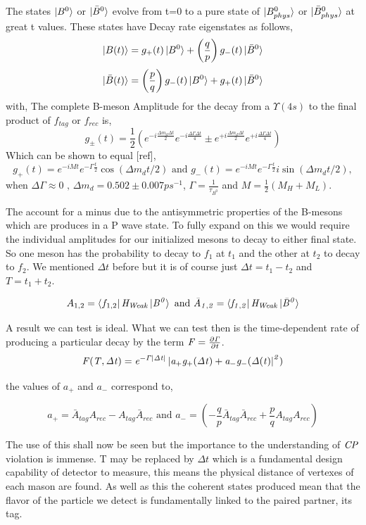 The states $\ket{B^{0}}$ or $\ket{\bar{B}^{0}}$ evolve from t=0 to a pure state of $\ket{B_{phys}^{0}}$ or $\ket{\bar{B}^{0}_{phys}}$ at great t values. 
These states have Decay rate eigenstates as follows,
\[\ket{B(t)}= g_+(t)\ket{B^0}+\left(\frac{q}{p}\right)g_{-}(t)\ket{\bar{B}^0}\]
\[\ket{\bar{B}(t)}= \left(\frac{p}{q}\right)g_-(t)\ket{B^0}+g_{+}(t)\ket{\bar{B}^0}\]
with,
The complete B-meson Amplitude for the decay from a $\Upsilon(4s)$ to the final product of $f_{tag}$ or $f_{rec}$ is,
 \[g_{\pm}(t)=\frac{1}{2}(e^{-i\frac{\Delta m_d \Delta t}{2}}e^{-i\frac{\Delta\Gamma \Delta t}{4}}\pm e^{+i\frac{\Delta m_d \Delta t}{2}}e^{+i\frac{\Delta\Gamma \Delta t}{4}})\]
Which can be shown to equal [ref],
\[g_{+}(t)=e^{-iMt}e^{-\Gamma\frac{t}{2}}\cos(\Delta m_d t/2) \mbox{ and }g_{-}(t)=e^{-iMt}e^{-\Gamma\frac{t}{2}}i\sin(\Delta m_d t/2),\]
when $\Delta\Gamma \approx 0 \mbox{ , }\Delta m_d = 0.502 \pm 0.007 ps^{-1}$, $\Gamma = \frac{1}{\tau_{B^0}}$ and $M=\frac{1}{2}(M_H+M_L)$.

The account for a minus due to the antisymmetric properties of the B-mesons which are produces in a P wave state. To fully expand on this we would require the individual amplitudes for our initialized mesons to decay to either final state. So one meson has the probability to decay to $f_1$ at $t_1$ and the other at $t_2$ to decay to $f_2$. We mentioned $\Delta t$ before but it is of course just $\Delta t = t_1 -t_2$ and $T= t_1 +t_2$.

\[A_{1,2}=\bra{f_{1,2}}\it{H_{Weak}}\ket{B^{0}} \mbox{ and } \bar{A}_{1,2}=\bra{f_{1,2}}\it{H_{Weak}}\ket{\bar{B}^{0}}\]

A result we can test is ideal. What we can test then is the time-dependent rate of producing a particular decay by the term $\it{F}=\frac{\partial\Gamma}{\partial t}$. 
\[\it{F}(T,\Delta t)=e^{-\Gamma\left|\Delta t\right|}\left| a_{+}g_{+}(\Delta t)+ a_{-}g_{-}(\Delta (t) \right|^{2})\]

the values of $a_+$ and $a_-$ correspond to,

\[ a_{+}=\bar{A}_{tag}A_{rec}-A_{tag}\bar{A}_{rec} \mbox{ and }a_{-}=\left(-\frac{q}{p}\bar{A}_{tag}\bar{A}_{rec}+\frac{p}{q}A_{tag}A_{rec}\right)\]

The use of this shall now be seen but the importance to the understanding of $\it{CP}$ violation is immense. T may be replaced by $\Delta t$ which is a fundamental design capability of detector to measure, this means the physical distance of vertexes of each mason are found. As well as this the coherent states produced mean that the flavor of the particle we detect is fundamentally linked to the paired partner, its tag.

